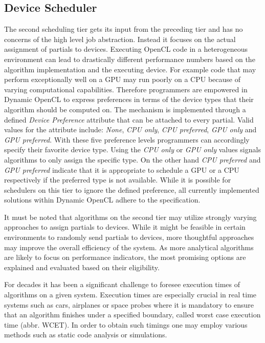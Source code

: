 \subsection{Device Scheduler}
The second scheduling tier gets its input from the preceding tier and has no concerns of the high level job abstraction. Instead it focuses on the actual assignment of partials to devices. Executing OpenCL code in a heterogeneous environment can lead to drastically different performance numbers based on the algorithm implementation and the executing device. For example code that may perform exceptionally well on a GPU may run poorly on a CPU because of varying computational capabilities. Therefore programmers are empowered in Dynamic OpenCL to express preferences in terms of the device types that their algorithm should be computed on. The mechanism is implemented through a defined \textit{Device Preference} attribute that can be attached to every partial. Valid values for the attribute include: \textit{None}, \textit{CPU only}, \textit{CPU preferred}, \textit{GPU only} and \textit{GPU preferred}. With these five preference levels programmers can accordingly specify their favorite device type. Using the \textit{CPU only} or \textit{GPU only} values signals algorithms to only assign the specific type. On the other hand \textit{CPU preferred} and \textit{GPU preferred} indicate that it is appropriate to schedule a GPU or a CPU respectively if the preferred type is not available. While it is possible for schedulers on this tier to ignore the defined preference, all currently implemented solutions within Dynamic OpenCL adhere to the specification.

It must be noted that algorithms on the second tier may utilize strongly varying approaches to assign partials to devices. While it might be feasible in certain environments to randomly send partials to devices, more thoughtful approaches may improve the overall efficiency of the system. As more analytical algorithms are likely to focus on performance indicators, the most promising options are explained and evaluated based on their eligibility.

For decades it has been a significant challenge to foresee execution times of algorithms on a given system. Execution times are especially crucial in real time systems such as cars, airplanes or space probes where it is mandatory to ensure that an algorithm finishes under a specified boundary, called worst case execution time (abbr. WCET). In order to obtain such timings one may employ various methods such as static code analysis or simulations\cite{wcet}.


